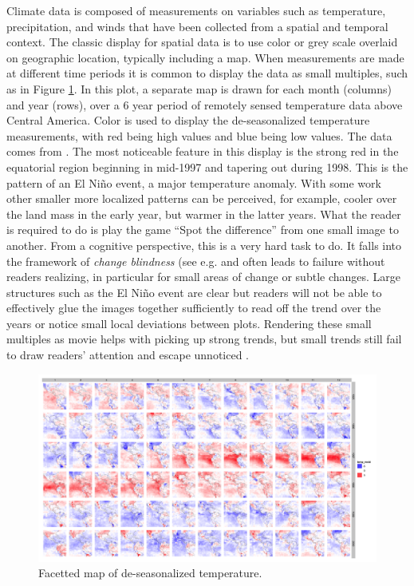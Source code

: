 \documentclass[oneside]{article}
\begin{document}
Climate data is composed of measurements on variables such as temperature, precipitation, and winds that have been collected from a spatial and temporal context. The classic display for spatial data is to use color or grey scale overlaid on geographic location, typically including a map. When measurements are made at different time periods it is common to display the data as small multiples, such as in Figure \ref{fig:facetted-map}. In this plot, a separate map is drawn for each month (columns) and year (rows), over a 6 year period of remotely sensed temperature data above Central America. Color is used to display the de-seasonalized temperature measurements, with red being high values and blue being low values. The data comes from \citet{murrell:2010}. The most noticeable feature in this display is the strong red in the equatorial region beginning in mid-1997 and tapering out during 1998. This is the pattern of an El Ni\~no event, a major temperature anomaly. With some work other smaller more localized patterns can be perceived, for example, cooler over the land mass in the early year, but warmer in the latter years. What the reader is required to do is play the game ``Spot the difference'' from one small image to another. From a cognitive perspective, this is a very hard task to do. It falls into the framework of {\it change blindness} (see e.g. \citet{healey:2011} and often leads to failure without readers realizing, in particular for small areas of change or subtle changes.  Large structures such as the El Ni\~no event are clear but readers will not be able to effectively glue the images together sufficiently to read off the trend over the years or notice small local deviations between plots. Rendering these small multiples as movie helps with picking up strong trends, but small trends still fail to draw readers' attention and escape unnoticed \citep{simons:gradual}.

\begin{figure}[htp]
\centerline{\includegraphics[width=6in]{nasa-colored-map.png}}
\caption{Facetted map of de-seasonalized temperature.}
\label{fig:facetted-map}
\end{figure}
\end{document}
